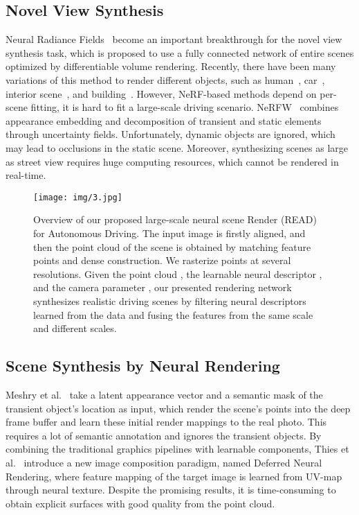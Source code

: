 \documentclass[sigconf]{acmart}
\begin{document}
\subsection{Novel View Synthesis}
Neural Radiance Fields~\cite{mildenhall2020NeRF} become an important breakthrough for the novel view synthesis task, which is proposed to use a fully connected network of entire scenes optimized by differentiable volume rendering. Recently, there have been many variations of this method to render different objects, such as human~\cite{Humannerf}, car~\cite{niemeyer2021giraffe}, interior scene~\cite{wang2021ibrnet}, and building~\cite{martin2021nerf}. However, NeRF-based methods depend on per-scene fitting, it is hard to fit a large-scale driving scenario. NeRFW~\cite{martin2021nerf} combines appearance embedding and decomposition of transient and static elements through uncertainty fields. Unfortunately, dynamic objects are ignored, which may lead to occlusions in the static scene. Moreover, synthesizing scenes as large as street view requires huge computing resources, which cannot be rendered in real-time. 

 \begin{figure*}[t]
  \centering
  \texttt{[image: img/3.jpg]}
  \caption{Overview of our proposed large-scale neural scene Render (READ) for Autonomous Driving. The input image is firstly aligned, and then the point cloud of the scene is obtained by matching feature points and dense construction. We rasterize points at several resolutions. Given the point cloud , the learnable neural descriptor , and the camera parameter , our presented  rendering network synthesizes realistic driving scenes by filtering neural descriptors learned from the data and fusing the features from the same scale and different scales.}
\label{fig:label2}
\end{figure*}

\subsection{Scene Synthesis by Neural Rendering}
Meshry et al.~\cite{meshry2019neural} take a latent appearance vector and a semantic mask of the transient object's location as input, which render the scene's points into the deep frame buffer and learn these initial render mappings to the real photo. This requires a lot of semantic annotation and ignores the transient objects. By combining the traditional graphics pipelines with learnable components, Thies et al.~\cite{thies2019deferred} introduce a new image composition paradigm, named Deferred Neural Rendering, where feature mapping of the target image is learned from UV-map through neural texture. Despite the promising results, it is time-consuming to obtain explicit surfaces with good quality from the point cloud.
\end{document}
